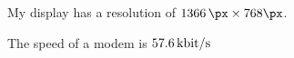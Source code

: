 \documentclass[a4paper,9pt]{scrartcl}
\begin{document}
My display has a resolution of $\SI{1366}{\px} \times \si{768}{\px}$.

The speed of a modem is $\SI[per-mode=symbol]{57.6}{\kilo\bit\per\second}$
\end{document}
